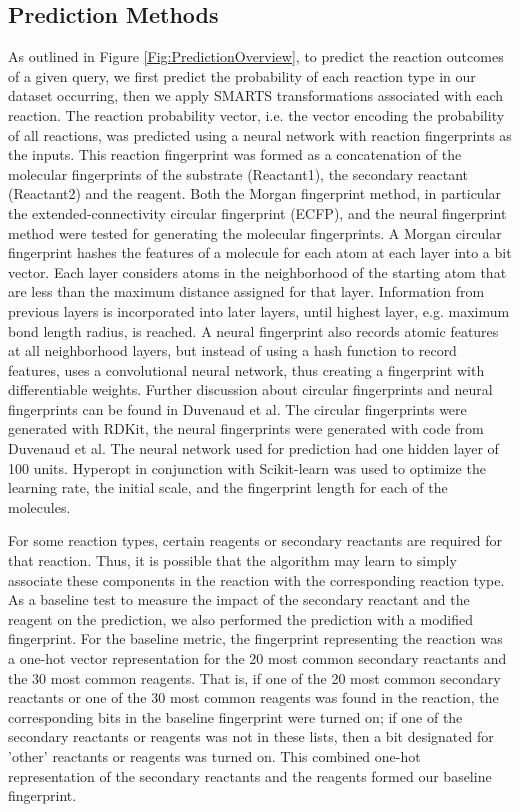 \subsection{Prediction Methods }

As outlined in Figure \ref{Fig:PredictionOverview}, to predict the reaction outcomes of a given query, we first predict the probability of each reaction type in our dataset occurring, then we apply SMARTS transformations associated with each reaction. The reaction probability vector, i.e. the vector encoding the probability of all reactions, was predicted using a neural network with reaction fingerprints as the inputs. This reaction fingerprint was formed as a concatenation of the molecular fingerprints of the substrate (Reactant1), the secondary reactant (Reactant2) and the reagent. Both the Morgan fingerprint method, in particular the extended-connectivity circular fingerprint (ECFP), and the neural fingerprint method were tested for generating the molecular fingerprints. A Morgan circular fingerprint hashes the features of a molecule for each atom at each layer into a bit vector. Each layer considers atoms in the neighborhood of the starting atom that are less than the maximum distance assigned for that layer. Information from previous layers is incorporated into later layers, until highest layer, e.g. maximum bond length radius, is reached\cite{Rogers2010Extended}. A neural fingerprint also records atomic features at all neighborhood layers, but instead of using a hash function to record features, uses a convolutional neural network, thus creating a fingerprint with differentiable weights. Further discussion about circular fingerprints and neural fingerprints can be found in Duvenaud et al\cite{duvenaud2015convolutional}. The circular fingerprints were generated with RDKit, the neural fingerprints were generated with code from Duvenaud et al\cite{duvenaud2015convolutional}. The neural network used for prediction had one hidden layer of 100 units. Hyperopt \cite{Bergstra_2015} in conjunction with Scikit-learn \cite{scikit-learn} was used to optimize the learning rate, the initial scale, and the fingerprint length for each of the molecules. 

For some reaction types, certain reagents or secondary reactants are required for that reaction. Thus, it is possible that the algorithm may learn to simply associate these components in the reaction with the corresponding reaction type. As a baseline test to measure the impact of the secondary reactant and the reagent on the prediction, we also performed the prediction with a modified fingerprint. For the baseline metric, the fingerprint representing the reaction was a one-hot vector representation for the 20 most common secondary reactants and the 30 most common reagents. That is, if one of the 20 most common secondary reactants or one of the 30 most common reagents was found in the reaction, the corresponding bits in the baseline fingerprint were turned on; if one of the secondary reactants or reagents was not in these lists, then a bit designated for 'other' reactants or reagents was turned on. This combined one-hot representation of the secondary reactants and the reagents formed our baseline fingerprint. 


